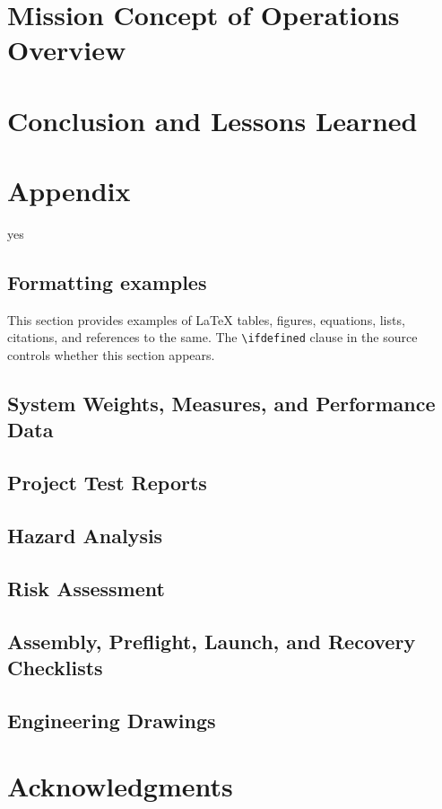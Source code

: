 \documentclass[conf]{new-aiaa}
\def\WIP{yes}
\begin{document}
\section{Mission Concept of Operations Overview}
\CONOPSDescription

\section{Conclusion and Lessons Learned}
\ConclusionDescription

\pagebreak
\section*{Appendix}

\ifdefined\WIP
\subsection*{Formatting examples}
	This section provides examples of \LaTeX{} tables, figures, equations,
	lists, citations, and references to the same. The \verb|\ifdefined| clause
	in the source controls whether this section appears.
\fi

\subsection{System Weights, Measures, and Performance Data}
\SystemMeasuresDescription{}

\subsection{Project Test Reports}
\TestReportsDescription{}

\subsection{Hazard Analysis}
\HazardAnalysisDescription{}

\subsection{Risk Assessment}
\RiskAssessmentDescription{}

\subsection{Assembly, Preflight, Launch, and Recovery Checklists}
\ChecklistsDescription{}

\subsection{Engineering Drawings}
\DrawingsDescription{}

\section*{Acknowledgments}

% 
\end{document}

